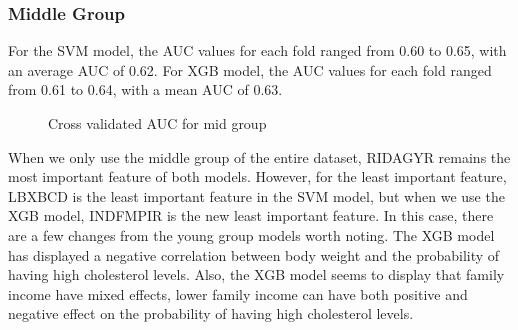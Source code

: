 \documentclass{article}
\begin{document}
\subsubsection{Middle Group}

For the SVM model, the AUC values for each fold ranged from 0.60 to 0.65, with an average AUC of 0.62. For XGB model, the AUC values for each fold ranged from 0.61 to 0.64, with a mean AUC of 0.63.

\begin{figure}[!ht]
    \centering
    \qquad
    \caption{Cross validated AUC for mid group}
\end{figure}

When we only use the middle group of the entire dataset, RIDAGYR remains the most important feature of both models. However, for the least important feature, LBXBCD is the least important feature in the SVM model, but when we use the XGB model, INDFMPIR is the new least important feature. In this case, there are a few changes from the young group models worth noting. The XGB model has displayed a negative correlation between body weight and the probability of having high cholesterol levels. Also, the XGB model seems to display that family income have mixed effects, lower family income can have both positive and negative effect on the probability of having high cholesterol levels.
\end{document}
